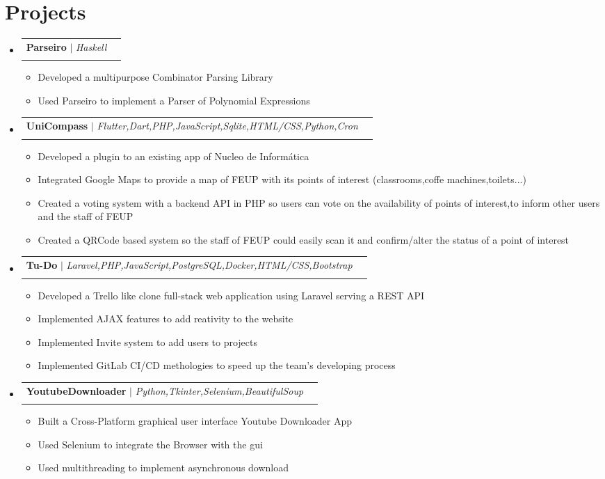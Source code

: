 \documentclass[letterpaper,11pt]{article}
\makeatletter
\newcommand{\resumeItem}[1]{
  \item\small{
    {#1 \vspace{-2pt}}
  }
}
\newcommand{\resumeProjectHeading}[2]{
    \item
    \begin{tabular*}{0.97\textwidth}{l@{\extracolsep{\fill}}r}
      \small#1 & #2 \\
    \end{tabular*}\vspace{-7pt}
}
\newcommand{\resumeSubHeadingListStart}{\begin{itemize}[leftmargin=0.15in, label={}]}
\newcommand{\resumeSubHeadingListEnd}{\end{itemize}}
\newcommand{\resumeItemListStart}{\begin{itemize}}
\newcommand{\resumeItemListEnd}{\end{itemize}\vspace{-5pt}}
\makeatother
\begin{document}
\section{Projects}
    \resumeSubHeadingListStart
      \resumeProjectHeading
          {\textbf{Parseiro} $|$ \emph{Haskell}}\\
          \resumeItemListStart
            \resumeItem{Developed a multipurpose Combinator Parsing Library}\\
            \resumeItem{Used Parseiro to implement a Parser of Polynomial Expressions}\\
          \resumeItemListEnd
      \resumeProjectHeading
          {\textbf{UniCompass} $|$ \emph{Flutter,Dart,PHP,JavaScript,Sqlite,HTML/CSS,Python,Cron}}\\
          \resumeItemListStart
            \resumeItem{Developed a plugin to an existing app of Nucleo de Informática}\\
            \resumeItem{Integrated Google Maps to provide a map of FEUP with its points of interest (classrooms,coffe machines,toilets...)}\\
            \resumeItem{Created a voting system with a backend API in PHP so users can vote on the availability of points of interest,to inform other users and the staff of FEUP}\\
            \resumeItem{Created a QRCode based system so the staff of FEUP could easily scan it and confirm/alter the status of a point of interest}\\
          \resumeItemListEnd
      \resumeProjectHeading
          {\textbf{Tu-Do} $|$ \emph{Laravel,PHP,JavaScript,PostgreSQL,Docker,HTML/CSS,Bootstrap}}\\
          \resumeItemListStart
            \resumeItem{Developed a Trello like clone full-stack web application using Laravel serving a REST API}\\
            \resumeItem{Implemented AJAX features to add reativity to the website}\\
            \resumeItem{Implemented Invite system to add users to projects}\\
            \resumeItem{Implemented GitLab CI/CD methologies to speed up the team's developing process}\\
          \resumeItemListEnd
      \resumeProjectHeading
          {\textbf{YoutubeDownloader} $|$ \emph{Python,Tkinter,Selenium,BeautifulSoup}}\\
          \resumeItemListStart
            \resumeItem{Built a Cross-Platform graphical user interface Youtube Downloader App}\\
            \resumeItem{Used Selenium to integrate the Browser with the gui}\\
            \resumeItem{Used multithreading to implement asynchronous download}\\
          \resumeItemListEnd
    \resumeSubHeadingListEnd
\end{document}
